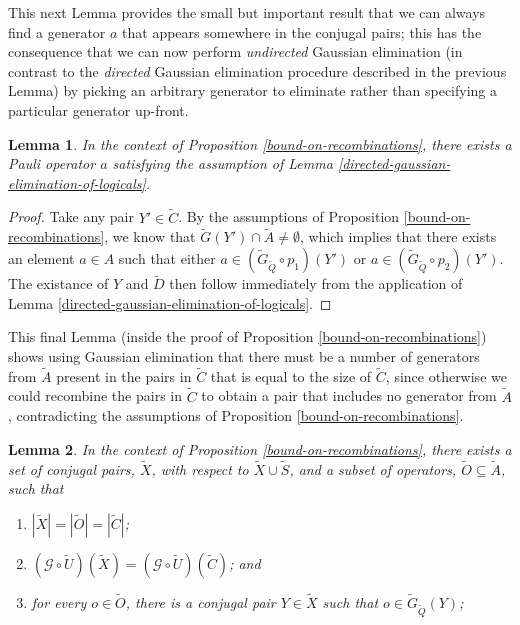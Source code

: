 \documentclass[twocolumn,showpacs,preprintnumbers,amsmath,amssymb,nofootinbib,pra,floatfix]{revtex4-1}
\newtheorem{lemma}{Lemma}
\newenvironment{remark}[1][Remark]{\begin{trivlist}
\item[\hskip \labelsep {\bfseries #1}]}{\end{trivlist}}
\newcommand{\set}{\tilde}
\newcommand{\genfun}{\mathcal{G}}
\begin{document}
\begin{remark}
This next Lemma provides the small but important result that we can always find a generator $a$ that appears somewhere in the conjugal pairs;  this has the consequence that we can now perform \emph{undirected} Gaussian elimination (in contrast to the \emph{directed} Gaussian elimination procedure described in the previous Lemma) by picking an arbitrary generator to eliminate rather than specifying a particular generator up-front.
\end{remark}

\begin{lemma}
\label{undirected-gaussian-elimination-of-logicals}
In the context of Proposition \ref{bound-on-recombinations}, there exists a Pauli operator $a$ satisfying the assumption of Lemma \ref{directed-gaussian-elimination-of-logicals}.
\end{lemma}

\begin{proof}
Take any pair $Y'\in\set C$.  By the assumptions of Proposition \ref{bound-on-recombinations}, we know that $\set G(Y')\cap \set A \ne \emptyset$, which implies that there exists an element $a\in A$ such that either $a\in (\set G_{\set Q}\circ p_1)(Y')$ or $a\in (\set G_{\set Q}\circ p_2)(Y')$.  The existance of $Y$ and $\set D$ then follow immediately from the application of Lemma \ref{directed-gaussian-elimination-of-logicals}.
\end{proof}
\begin{remark}
This final Lemma (inside the proof of Proposition \ref{bound-on-recombinations}) shows using Gaussian elimination that there must be a number of generators from $\set A$ present in the pairs in $\set C$ that is equal to the size of $\set C$, since otherwise we could recombine the pairs in $\set C$ to obtain a pair that includes no generator from $\set A$, contradicting the assumptions of Proposition \ref{bound-on-recombinations}.
\end{remark}
\begin{lemma}
\label{elimination-to-create-subset}
In the context of Proposition \ref{bound-on-recombinations}, there exists a set of conjugal pairs, $\set X$, with respect to $\set X\cup\set S$, and a subset of operators, $\set O\subseteq \set A$, such that
\begin{enumerate}
\item $|\set X|=|\set O|=|\set C|$;
\item $(\genfun\circ\set U)(\set X)=(\genfun\circ\set U)(\set C)$; and
\item for every $o\in\set O$, there is a conjugal pair $Y\in\set X$ such that $o\in\set G_{\set Q}(Y)$;
\end{enumerate}
\end{lemma}
\end{document}
